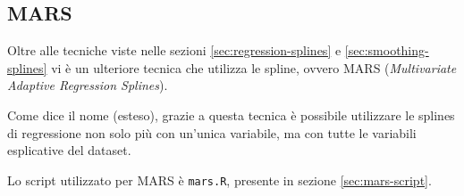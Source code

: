 
\subsection{MARS}\label{doc:smoothing-splines}
Oltre alle tecniche viste nelle sezioni \ref{sec:regression-splines} e
\ref{sec:smoothing-splines} vi è un ulteriore tecnica che utilizza le spline,
ovvero MARS (\emph{Multivariate Adaptive Regression Splines}).

Come dice il nome (esteso), grazie a questa tecnica è possibile utilizzare le
splines di regressione non solo più con un'unica variabile, ma con tutte le
variabili esplicative del dataset.

Lo script utilizzato per MARS è \texttt{mars.R}, presente in sezione
\ref{sec:mars-script}.
